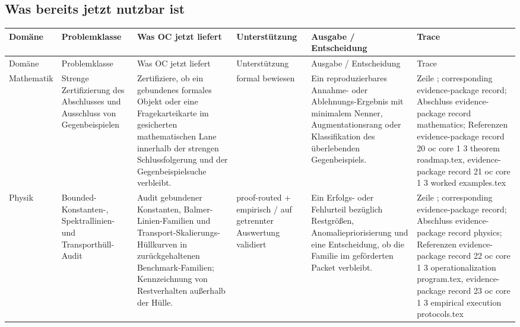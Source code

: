 \subsection{Was bereits jetzt nutzbar ist}
\begingroup
\scriptsize
\setlength{\emergencystretch}{1.5em}
\setlength{\tabcolsep}{2pt}
\setlength{\LTleft}{0pt}
\setlength{\LTright}{0pt}
\begin{longtable}{@{}L{0.11\textwidth}L{0.16\textwidth}L{0.19\textwidth}L{0.12\textwidth}L{0.18\textwidth}L{0.16\textwidth}@{}}
\toprule
Domäne & Problemklasse & Was OC jetzt liefert & Unterstützung & Ausgabe / Entscheidung & Trace \\
\midrule
\endfirsthead
\toprule
Domäne & Problemklasse & Was OC jetzt liefert & Unterstützung & Ausgabe / Entscheidung & Trace \\
\midrule
\endhead
Mathematik & Strenge Zertifizierung des Abschlusses und Ausschluss von Gegenbeispielen & Zertifiziere, ob ein gebundenes formales Objekt oder eine Fragekarteikarte im gesicherten mathematischen Lane innerhalb der strengen Schlussfolgerung und der Gegenbeispielsuche verbleibt. & formal bewiesen & Ein reproduzierbares Annahme- oder Ablehnungs-Ergebnis mit minimalem Nenner, Augmentationsrang oder Klassifikation des überlebenden Gegenbeispiels. & Zeile ; corresponding evidence-package record; \allowbreak Abschluss evidence-package record mathematics; \allowbreak Referenzen evidence-package record 20 oc core 1 3 theorem roadmap.tex, \allowbreak evidence-package record 21 oc core 1 3 worked examples.tex \\
Physik & Bounded-Konstanten-, Spektrallinien- und Transporthüll-\allowbreak Audit & Audit gebundener Konstanten, Balmer-Linien-Familien und Transport-Skalierungs-Hüllkurven in zurückgehaltenen Benchmark-Familien; Kennzeichnung von Restverhalten außerhalb der Hülle. & proof-routed + empirisch / auf getrennter Auswertung validiert & Ein Erfolgs- oder Fehlurteil bezüglich Restgrößen, Anomaliepriorisierung und eine Entscheidung, ob die Familie im geförderten Packet verbleibt. & Zeile ; corresponding evidence-package record; \allowbreak Abschluss evidence-package record physics; \allowbreak Referenzen evidence-package record 22 oc core 1 3 operationalization program.tex, \allowbreak evidence-package record 23 oc core 1 3 empirical execution protocols.tex \\

\end{longtable}
